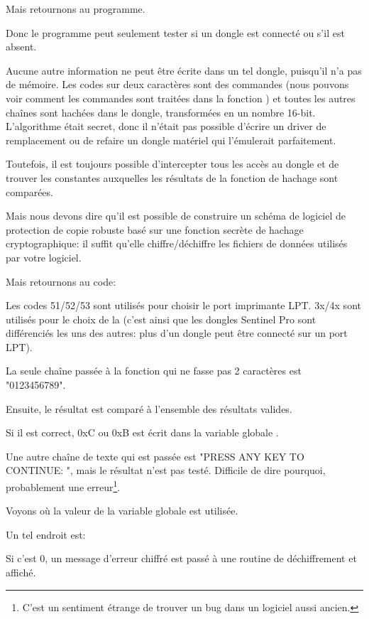 Mais retournons au programme.

Donc le programme peut seulement tester si un dongle est connecté ou s'il est absent.

Aucune autre information ne peut être écrite dans un tel dongle, puisqu'il n'a pas
de mémoire.
Les codes sur deux caractères sont des commandes (nous pouvons voir comment les commandes
sont traitées dans la fonction ) et toutes les autres chaînes sont hachées
dans le dongle, transformées en un nombre 16-bit.
L'algorithme était secret, donc il n'était pas possible d'écrire un driver de remplacement
ou de refaire un dongle matériel qui l'émulerait parfaitement.

Toutefois, il est toujours possible d'intercepter tous les accès au dongle et de
trouver les constantes auxquelles les résultats de la fonction de hachage sont comparées.

Mais nous devons dire qu'il est possible de construire un schéma de logiciel de protection
de copie robuste basé sur une fonction secrète de hachage cryptographique: il suffit
qu'elle chiffre/déchiffre les fichiers de données utilisés par votre logiciel.

Mais retournons au code:

Les codes 51/52/53 sont utilisés pour choisir le port imprimante LPT.
3x/4x sont utilisés pour le choix de la  (c'est ainsi que les dongles
Sentinel Pro sont différenciés les uns des autres: plus d'un dongle peut être connecté
sur un port LPT).

La seule chaîne passée à la fonction qui ne fasse pas 2 caractères est "0123456789".

Ensuite, le résultat est comparé à l'ensemble des résultats valides.

Si il est correct, 0xC ou 0xB est écrit dans la variable globale .%

Une autre chaîne de texte qui est passée est
"PRESS ANY KEY TO CONTINUE: ", mais le résultat n'est pas testé.
Difficile de dire pourquoi, probablement une erreur\footnote{C'est un sentiment
étrange de trouver un bug dans un logiciel aussi ancien.}.

Voyons où la valeur de la variable globale  est utilisée.

Un tel endroit est:



Si c'est 0, un message d'erreur chiffré est passé à une routine de déchiffrement
et affiché.

